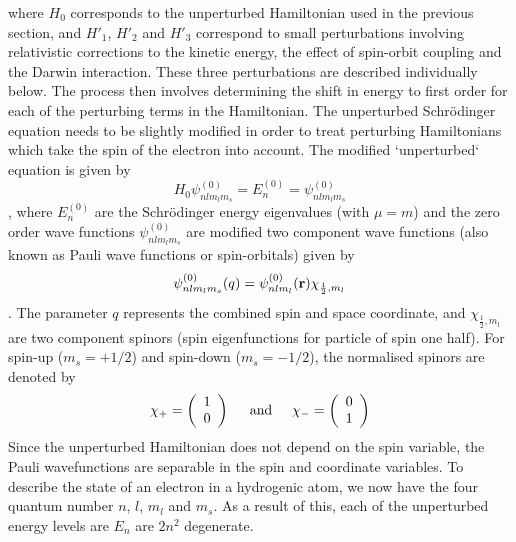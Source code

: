 \documentclass[a4paper]{IEEEtran}
\begin{document}
    where $H_0$ corresponds to the unperturbed Hamiltonian used in the previous section,
    and $H'_1$, $H'_2$ and $H'_3$ correspond to small perturbations involving relativistic
    corrections to the kinetic energy, the effect of spin-orbit coupling and the Darwin
    interaction. These three perturbations are described individually below.
    The process then involves determining the shift in energy to first order for 
    each of the perturbing terms in the Hamiltonian. The unperturbed Schr\"odinger 
    equation needs to be slightly modified in order to treat perturbing Hamiltonians
    which take the spin of the electron into account. The modified `unperturbed`
    equation is given by
    \begin{equation}
        H_0 \psi_{nlm_l m_s }^{(0)} = E_{n}^{(0)} = \psi_{nlm_l m_s}^{(0)} 
    \end{equation},
    where $E_{n}^{(0)}$ are the Schr\"odinger energy eigenvalues (with $\mu = m$) and 
    the zero order wave functions $\psi_{nlm_l m_s}^{(0)}$ are modified two component
    wave functions (also known as Pauli wave functions or spin-orbitals) given by
    \begin{equation}
        \psi_{nlm_l m_s}^{(0)}(q) = \psi_{nlm_l}^{(0)}({\bf r}) \chi_{\frac{1}{2},m_l}
    \end{equation}.
    The parameter $q$ represents the combined spin and space coordinate, and 
    $\chi_{\frac{1}{2},m_l}$ are two component spinors (spin eigenfunctions for
    particle of spin one half). For spin-up ($m_s = +1/2$) and spin-down ($m_s = -1/2$),
    the normalised spinors are denoted by
    \begin{equation}
        \chi_+ = \left( \begin{array}{c}
                    1 \\ 0
                 \end{array} \right)
        \hspace{5mm} \mathrm{and} \hspace{5mm}
        \chi_- = \left( \begin{array}{c}
                    0 \\ 1
                 \end{array} \right)
    \end{equation}
    Since the unperturbed Hamiltonian does not depend on the spin variable, the
    Pauli wavefunctions are separable in the spin and coordinate variables.
    To describe the state of an electron in a hydrogenic atom, we now have the four
    quantum number $n$, $l$, $m_l$ and $m_s$. As a result of this, each of the
    unperturbed energy levels are $E_n$ are $2n^2$ degenerate.
\end{document}
